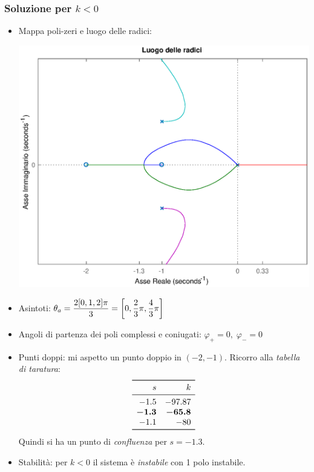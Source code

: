 \subsubsection{Soluzione per \(k<0\)}
\begin{itemize}
	\item Mappa poli-zeri e luogo delle radici:
		\begin{center}\includegraphics[scale=.5]{mod1/assets/rl_ex317n.eps}\end{center}
	\item Asintoti: \(\displaystyle \theta_a = \frac{2[0,1,2]\pi}{3} = \qty[0,\frac{2}{3}\pi,\frac{4}{3}\pi]\)
	\item Angoli di partenza dei poli complessi e coniugati: \(\varphi_+ = 0,\; \varphi_- = 0\)
	\item Punti doppi: mi aspetto un punto doppio in \((-2,-1)\). Ricorro alla \emph{tabella di taratura}:
		\[\begin{array}{rr}
			\toprule
			s & k \\
			\midrule
			-1.5 & -97.87 \\
			\bm{-1.3} & \bm{-65.8} \\
			-1.1 & -80 \\
			\bottomrule
		\end{array}\]
		Quindi si ha un punto di \emph{confluenza} per \(s=-1.3\).
	\item Stabilità: per \(k<0\) il sistema è \emph{instabile} con 1 polo instabile.
\end{itemize}